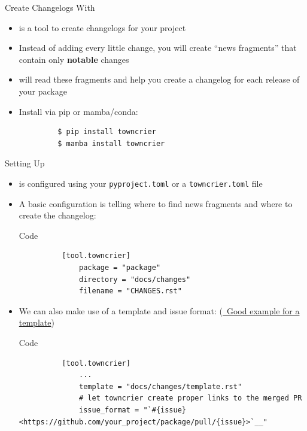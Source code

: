 \begin{frame}[fragile]{
    Create Changelogs With \tc
    \hfill
  }
  \begin{itemize}
    \setlength{\itemsep}{1.5em}
    \item \tc{} is a tool to create changelogs for your project
    \item Instead of adding every little change, you will create \enquote{news fragments}
      that contain only \textbf{notable} changes
    \item \tc{} will read these fragments and help you create a changelog for each release
      of your package
    \item Install \tc{} via pip or mamba/conda:
      \begin{verbatim}
         $ pip install towncrier
         $ mamba install towncrier
      \end{verbatim}

  \end{itemize}
\end{frame}

\begin{frame}[fragile]{Setting Up \tc}
  \begin{itemize}
    \setlength{\itemsep}{1.5em}
    \item \tc{} is configured using your \texttt{pyproject.toml} or a \texttt{towncrier.toml} file
    \item A basic configuration is telling \tc{} where to find news fragments and where to
      create the changelog:
      \begin{block}{Code}
        \begin{verbatim}
          [tool.towncrier]
              package = "package"
              directory = "docs/changes"
              filename = "CHANGES.rst"
        \end{verbatim}
      \end{block}
    \item We can also make use of a template and issue format:
      (\href{https://github.com/radionets-project/pyvisgen/blob/main/docs/changes/template.rst}{\faExternalLink*~Good example for a template})
      \begin{block}{Code}
        \begin{verbatim}
          [tool.towncrier]
              ...
              template = "docs/changes/template.rst"
              # let towncrier create proper links to the merged PR
              issue_format = "`#{issue} <https://github.com/your_project/package/pull/{issue}>`__"
        \end{verbatim}
      \end{block}
  \end{itemize}
\end{frame}

